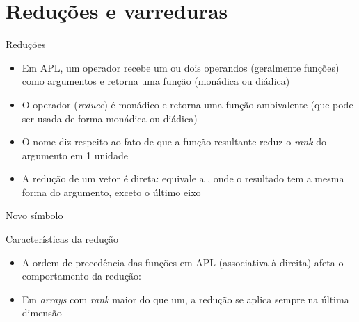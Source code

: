 \section{Reduções e varreduras}


\begin{frame}[fragile]{Reduções}

    \begin{itemize}
        \item Em APL, um operador recebe um ou dois operandos (geralmente funções) como argumentos 
            e retorna uma função (monádica ou diádica)

        \item O operador  (\textit{reduce}) é monádico e retorna uma função 
            ambivalente (que pode ser usada de forma monádica ou diádica)

        \item O nome diz respeito ao fato de que a função resultante reduz o \textit{rank} do 
            argumento em 1 unidade

        \item A redução de um vetor é direta:  equivale a 
            , onde  o resultado tem a mesma forma do argumento, 
            exceto o último eixo

    \end{itemize}

\end{frame}

\begin{frame}[fragile]{Novo símbolo}


\end{frame}

\begin{frame}[fragile]{Características da redução}

    \begin{itemize}
        \item A ordem de precedência das funções em APL (associativa à direita) afeta o comportamento da redução:

        \item Em \textit{arrays} com \textit{rank} maior do que um, a redução se aplica sempre na última dimensão
    \end{itemize}

\end{frame}

